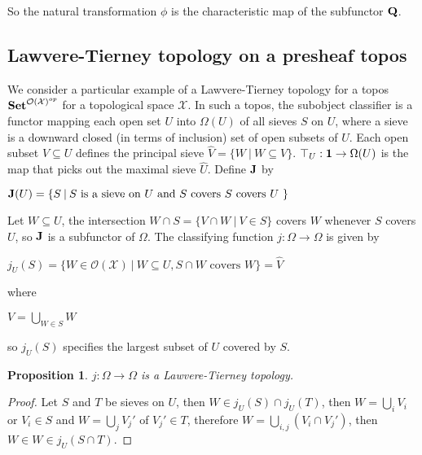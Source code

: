 \documentclass[a4paper]{article}
\theoremstyle{defin}
\theoremstyle{theorem}
\theoremstyle{claim}
\theoremstyle{prop}
\newtheorem{prop}{Proposition}
\theoremstyle{lemma}
\theoremstyle{fact}
\theoremstyle{ex}
\theoremstyle{col}
\begin{document}
\centerline{
}
So the natural transformation $\phi$ is the characteristic map of the subfunctor ${\bf Q}$.

\subsection{Lawvere-Tierney topology on a presheaf topos}

We consider a particular example of a Lawvere-Tierney topology for a topos ${\bf Set}^{\mathcal{O}(\mathcal{X})^{op}}$ for a topological space $\mathcal{X}$. In such a topos, the subobject classifier is a functor mapping each open set $U$ into $\Omega(U)$ of all sieves $S$ on $U$, where a sieve is a downward closed (in terms of inclusion) set of open subsets of $U$. Each open subset $V \subseteq U$ defines the principal sieve $\hat{V} = \{ W \: | \: W \subseteq V \}$. $\top_U : {\bf 1} \to \Omega(U)$ is the map that picks out the maximal sieve $\hat{U}$. Define ${\bf J}$ by

\begin{center}
${\bf J}(U) = \{ S \: | \: \text{$S$ is a sieve on $U$ and $S$ covers $S$ covers $U$ }\}$
\end{center}

Let $W \subseteq U$, the intersection $W \cap S = \{ V \cap W \: | \: V \in S \}$ covers $W$ whenever $S$ covers $U$, so ${\bf J}$ is a subfunctor of $\Omega$. The classifying function $j : \Omega \to \Omega$ is given by
\begin{center}
$j_U(S) = \{ W \in \mathcal{O}(\mathcal{X}) \: | \: W \subseteq U, \text{$S \cap W$ covers $W$}\} = \hat{V}$
\end{center}
where
\begin{center}
$V = \bigcup \limits_{W \in S} W$
\end{center}
so $j_U(S)$ specifies the largest subset of $U$ covered by $S$.

\begin{prop}
$j : \Omega \to \Omega$ is a Lawvere-Tierney topology.
\end{prop}

\begin{proof}
Let $S$ and $T$ be sieves on $U$, then $W \in j_U(S) \cap j_U(T)$, then $W = \bigcup \limits_i V_i$ or $V_i \in S$ and $W = \bigcup \limits_j V_j'$ of $V_j' \in T$, therefore $W = \bigcup \limits_{i, j} (V_i \cap V_j')$, then $W \in W \in j_U(S \cap T)$.
\end{proof}
\end{document}
